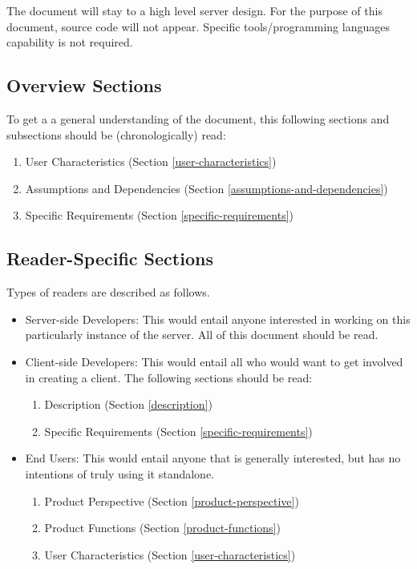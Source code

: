 The document will stay to a high level server design. For the purpose of this document, source code will not appear. Specific tools/programming languages capability is not required.

\subsection{Overview Sections}\label{overview-sections}
To get a a general understanding of the document, this following sections and subsections should be (chronologically) read:

\begin{enumerate}
    \item User Characteristics (Section \ref{user-characteristics})
    \item Assumptions and Dependencies (Section \ref{assumptions-and-dependencies})
    \item Specific Requirements (Section \ref{specific-requirements})
\end{enumerate}

\subsection{Reader-Specific Sections}\label{reader-specific-sections}

Types of readers are described as follows.

\begin{itemize}
    \item Server-side Developers: This would entail anyone interested in working on this particularly instance of the server. All of this document should be read.
    \item Client-side Developers: This would entail all who would want to get involved in creating a client. The following sections should be read:
    \begin{enumerate}
        \item Description (Section \ref{description})
        \item Specific Requirements (Section \ref{specific-requirements})
    \end{enumerate}

    \item End Users: This would entail anyone that is generally interested, but has no intentions of truly using it standalone.
    \begin{enumerate}
      \item Product Perspective (Section \ref{product-perspective})
      \item Product Functions (Section \ref{product-functions})
      \item User Characteristics (Section \ref{user-characteristics})
    \end{enumerate}
\end{itemize}

